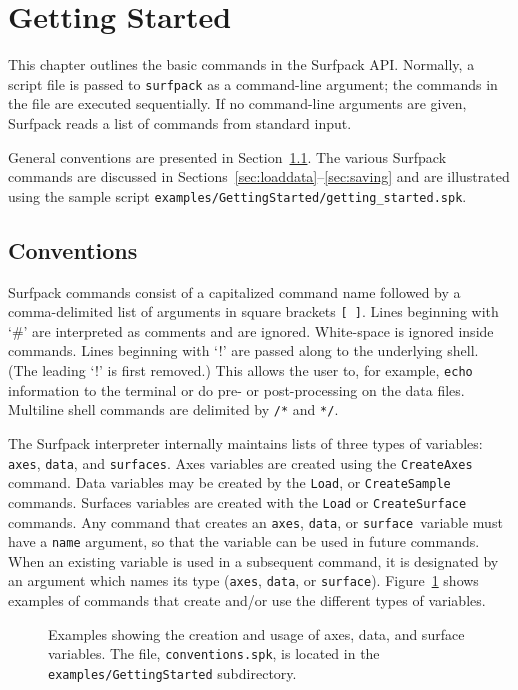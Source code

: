 \documentclass{article}
\begin{document}
\section{Getting Started}
This chapter outlines the basic commands in the Surfpack API.  Normally, a script file
is passed to \texttt{surfpack} as a command-line argument; the commands in
the file are executed sequentially.  If no command-line arguments are given,
Surfpack reads a list of commands from standard input.

General conventions are presented in Section~\ref{sec:conventions}.  The various Surfpack commands
are discussed in Sections~\ref{sec:loaddata}--\ref{sec:saving} and are illustrated using the sample script \texttt{examples/GettingStarted/getting\_started.spk}.  

\subsection{Conventions}\label{sec:conventions}
Surfpack commands consist of a capitalized command name followed by a
comma-delimited list of arguments in square brackets \texttt{[ ]}.  Lines beginning with  `\#' are interpreted as comments and are ignored.  White-space is ignored inside commands. Lines beginning with `!' are passed along to the underlying shell.  (The
leading `!' is first removed.)  This allows the user to, for example, \texttt{echo}
information to the terminal or do pre- or post-processing on the data files.
Multiline shell commands are delimited by \texttt{/*} and \texttt{*/}.

The Surfpack interpreter internally maintains lists of three types of variables: \texttt{axes},
\texttt{data}, and \texttt{surfaces}.  Axes variables are created using the \texttt{CreateAxes}
command.  Data variables may be created by the \texttt{Load}, or \texttt{CreateSample}
commands.  Surfaces variables are created with the \texttt{Load} or
\texttt{CreateSurface} commands.  Any command that creates an \texttt{axes}, \texttt{data}, or \texttt{surface
}variable must have a \texttt{name} argument, so that the variable can be used in 
future commands.  When an existing variable is
used in a subsequent command, it is designated by an argument which names its
type (\texttt{axes}, \texttt{data}, or \texttt{surface}).  Figure~\ref{fig:conventions} shows examples of commands that create and/or use the different types of variables. 

\begin{figure}[htbp]
  \centering
  \begin{bigbox}
	\begin{small}
 	\end{small}
  \end{bigbox}
  \caption{Examples showing the creation and usage of axes, data, and surface variables.  The file, \texttt{conventions.spk}, is located in the \texttt{examples/GettingStarted} subdirectory.}
   \label{fig:conventions}
\end{figure}
\end{document}
